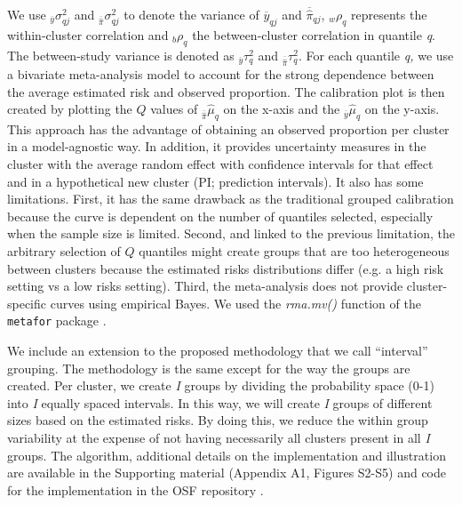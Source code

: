 We use \({}_{\overline{y}}\sigma_{qj}^{2}\) and \({}_{\overline{\widehat{\pi}}}\sigma_{qj}^{2}\) to denote the variance of \({\overline{y}}_{qj}\) and \({\overline{\widehat{\pi}}}_{qj}\), \({}_{w}\rho_{q}\) represents the within-cluster correlation and \({}_{b}\rho_{q}\) the between-cluster correlation in quantile \emph{q}. The between-study variance is denoted as \({}_{\overline{y}}\tau_{q}^{2}\) and \({}_{\overline{\widehat{\pi}}}\tau_{q}^{2}\). For each quantile \emph{q,} we use a bivariate meta-analysis model to account for the strong dependence between the average estimated risk and observed proportion. The calibration plot is then created by plotting the \(Q\) values of \({}_{\overline{\widehat{\pi}}}\hat{\mu}_{q}\) on the x-axis and the \({}_{\overline{y}}\hat{\mu}_{q}\) on the y-axis. This approach has the advantage of obtaining an observed proportion per cluster in a model-agnostic way. In addition, it provides uncertainty measures in the cluster with the average random effect with confidence intervals for that effect and in a hypothetical new cluster (\gls{PI}; prediction intervals). It also has some limitations. First, it has the same drawback as the traditional grouped calibration because the curve is dependent on the number of quantiles selected, especially when the sample size is limited. Second, and linked to the previous limitation, the arbitrary selection of \(Q\) quantiles might create groups that are too heterogeneous between clusters because the estimated risks distributions differ (e.g. a high risk setting vs a low risks setting). Third, the meta-analysis does not provide cluster-specific curves using empirical Bayes. We used the \textit{rma.mv()} function of the \texttt{metafor} package \cite{viechtbauerConductingMetaanalysesMetafor2010a}.

We include an extension to the proposed methodology that we call ``interval'' grouping. The methodology is the same except for the way the groups are created. Per cluster, we create \emph{I} groups by dividing the probability space (0-1) into \emph{I} equally spaced intervals\emph{.} In this way, we will create \emph{I} groups of different sizes based on the estimated risks. By doing this, we reduce the within group variability at the expense of not having necessarily all clusters present in all \emph{I} groups. The algorithm, additional details on the implementation and illustration are available in the Supporting material (Appendix A1, Figures S2-S5) and code for the implementation in the \gls{OSF} repository \cite{barrenadaOSFClusteredFlexible2024}. 

